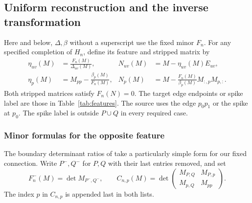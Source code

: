 \documentclass[11pt]{article}
\theoremstyle{definition}
\begin{document}
\subsection{Uniform reconstruction and the inverse transformation}
\label{sec:construction}

Here and below, \(\Delta,\beta\) without a superscript use the fixed
minor \(F_n\). For any specified completion of \(H_n\), define its
feature and stripped matrix by
\begin{align}
 \eta_{uv}(M)&=\frac{F_n(M)}{\Delta_{uv}(M)},&
 N_{uv}(M)&=M-\eta_{uv}(M)E_{uv},
 \label{eq:complete-edge}\\
 \eta_p(M)&=M_{pp}-\frac{\beta_p(M)}{F_n(M)},&
 N_p(M)&=M-\frac{F_n(M)}{\beta_p(M)}M_{:,p}M_{p,:}.
 \label{eq:complete-spike}
\end{align}
Both stripped matrices satisfy \(F_n(N)=0\).
The target edge endpoints or spike label are those in
Table~\ref{tab:features}. The source uses the edge \(p_0p_1\)
or the spike at \(p_0\).
The spike label is outside \(P\cup Q\) in every required case.

\subsubsection{Minor formulas for the opposite feature}

The boundary determinant ratios of \cite[Corollaries 4.3--4.4]{CIM}
take a particularly simple form for our fixed connection.
Write \(P^-,Q^-\) for \(P,Q\) with their last entries removed, and set
\[
 F_n^-(M)=\det M_{P^-,Q^-},\qquad
 C_{n,p}(M)=
 \det\begin{pmatrix}
 M_{P,Q}&M_{P,p}\\ M_{p,Q}&M_{pp}
 \end{pmatrix}.
\]
The index \(p\) in \(C_{n,p}\) is appended last in both lists.
\end{document}
